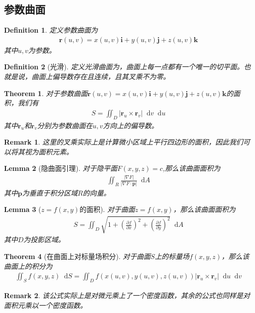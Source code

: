 \documentclass[12pt,a4paper,UTF8]{ctexbook}
\theoremstyle{plain}
\newtheorem{theorem}{\indent Theorem}[section]
\newtheorem{lemma}[theorem]{\indent Lemma}
\newtheorem{definition}{\indent Definition}[section]
\newtheorem{remark}{\indent Remark}[section]
\newcommand{\diff}{\mathop{}\!\mathrm{d}} %
\newcommand{\vb}[1]{\mathbf{#1}}          %
\begin{document}
\subsection{参数曲面}
\begin{definition} 
    定义参数曲面为
    \begin{align*} 
        \vb{r}(u,v) = x(u,v)\vb{i} + y(u,v)\vb{j} + z(u,v)\vb{k}
    \end{align*} 
    其中$u,v$为参数。
\end{definition}
\begin{definition}[光滑] 
    定义光滑曲面为，曲面上每一点都有一个唯一的切平面。也就是说，曲面上偏导数存在且连续，且其叉乘不为零。
\end{definition}
\begin{theorem} 
    对于参数曲面$\vb {r}(u,v) = x(u,v)\vb{i} + y(u,v)\vb{j} + z(u,v)\vb{k}$的面积，我们有
    \begin{align*} 
        S = \iint_D |\vb{r}_u\times \vb{r}_v|\diff v \diff u
    \end{align*}
    其中$\vb{r}_u$和$\vb{r}_v$分别为参数曲面在$u,v$方向上的偏导数。
\end{theorem}
\begin{remark}
    这里的叉乘实际上是计算微小区域上平行四边形的面积，因此我们可以将其视为面积元素。
\end{remark}
\begin{lemma}[隐曲面引理]
    对于隐平面$F(x,y,z)=c$,那么该曲面面积为
    \begin{align*} 
        \iint_R \frac{|\nabla F|}{|\nabla F\cdot \vb{p}|}\diff A
    \end{align*} 
    其中$\vb{p}$为垂直于积分区域$R$的向量。
\end{lemma}
\begin{lemma}[$z=f(x,y)$的面积] 
    对于曲面$z=f(x,y)$，那么该曲面面积为
    \begin{align*} 
        S = \iint_D \sqrt{1+(\frac{\partial f}{\partial x})^2+(\frac{\partial f}{\partial y})^2}\diff A
    \end{align*}
    其中$D$为投影区域。
\end{lemma}
\begin{theorem}[在曲面上对标量场积分]
    对于曲面$S$上的标量场$f(x,y,z)$，那么该曲面上的积分为
    \begin{align*} 
        \iint_S f(x,y,z)\diff S = \iint_D f(x(u,v),y(u,v),z(u,v))|\vb{r}_u\times \vb{r}_v|\diff u\diff v
    \end{align*}
\end{theorem}
\begin{remark} 
    该公式实际上是对微元乘上了一个密度函数，其余的公式也同样是对面积元乘以一个密度函数。
\end{remark}
\end{document}
